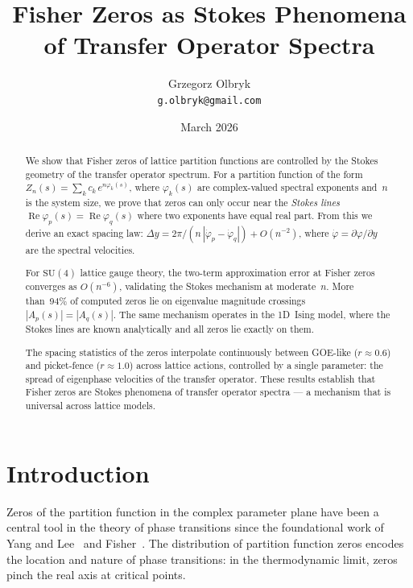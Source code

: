 \documentclass[12pt]{article}
\title{Fisher Zeros as Stokes Phenomena of Transfer Operator Spectra}
\author{Grzegorz Olbryk\\[-2pt]
\small\texttt{g.olbryk@gmail.com}}
\date{March 2026}
\theoremstyle{definition}
\theoremstyle{remark}
\newcommand{\SU}{\mathrm{SU}}
\newcommand{\re}{\operatorname{Re}}
\begin{document}
\maketitle

\begin{abstract}
We show that Fisher zeros of lattice partition functions are controlled
by the Stokes geometry of the transfer operator spectrum.  For a
partition function of the form $Z_n(s) = \sum_k c_k\,e^{n\varphi_k(s)}$,
where $\varphi_k(s)$ are complex-valued spectral exponents and~$n$ is
the system size, we prove that zeros can only occur near the
\emph{Stokes lines} $\re\varphi_p(s) = \re\varphi_q(s)$ where two
exponents have equal real part.  From this we derive an exact spacing
law: $\Delta y = 2\pi/(n\,|\dot\varphi_p - \dot\varphi_q|) + O(n^{-2})$,
where $\dot\varphi = \partial\varphi/\partial y$ are the spectral
velocities.

For $\SU(4)$ lattice gauge theory, the two-term approximation error
at Fisher zeros converges as $O(n^{-6})$, validating the Stokes
mechanism at moderate~$n$.  More than~94\% of computed zeros lie on
eigenvalue magnitude crossings $|A_p(s)| = |A_q(s)|$.  The same
mechanism operates in the 1D~Ising model, where the Stokes lines are
known analytically and all zeros lie exactly on them.

The spacing statistics of the zeros interpolate continuously between
GOE-like ($r \approx 0.6$) and picket-fence ($r \approx 1.0$)
across lattice actions, controlled by a single parameter: the spread
of eigenphase velocities of the transfer operator.  These results
establish that Fisher zeros are Stokes phenomena of transfer operator
spectra --- a mechanism that is universal across lattice models.
\end{abstract}


\section{Introduction}
\label{sec:intro}

Zeros of the partition function in the complex parameter plane have
been a central tool in the theory of phase transitions since the
foundational work of Yang and Lee~\cite{YangLee1952} and
Fisher~\cite{Fisher1965}.  The distribution of partition function zeros
encodes the location and nature of phase transitions: in the
thermodynamic limit, zeros pinch the real axis at critical points.
\end{document}
